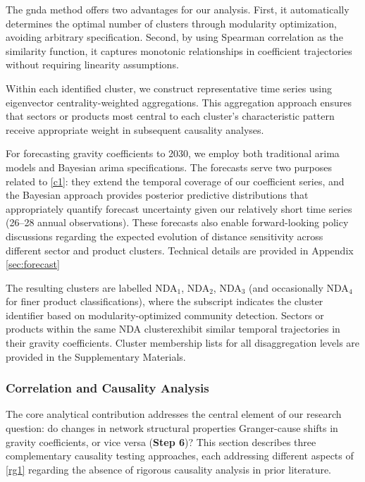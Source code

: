 \documentclass[preprint, 3p,
authoryear]{elsarticle} %
\begin{document}
The \gls{gnda} method offers two advantages for our analysis. First, it
automatically determines the optimal number of clusters through
modularity optimization, avoiding arbitrary specification. Second, by
using Spearman correlation as the similarity function, it captures
monotonic relationships in coefficient trajectories without requiring
linearity assumptions.

Within each identified cluster, we construct representative time series
using eigenvector centrality-weighted aggregations. This aggregation
approach ensures that sectors or products most central to each cluster's
characteristic pattern receive appropriate weight in subsequent
causality analyses.

For forecasting gravity coefficients to 2030, we employ both traditional
\gls{arima} models and Bayesian \gls{arima} specifications. The
forecasts serve two purposes related to \ref{c1}: they extend the
temporal coverage of our coefficient series, and the Bayesian approach
provides posterior predictive distributions that appropriately quantify
forecast uncertainty given our relatively short time series (26--28
annual observations). These forecasts also enable forward-looking policy
discussions regarding the expected evolution of distance sensitivity
across different sector and product clusters. Technical details are
provided in Appendix \ref{sec:forecast}

The resulting clusters are labelled NDA\(_1\), NDA\(_2\), NDA\(_3\) (and
occasionally NDA\(_4\) for finer product classifications), where the
subscript indicates the cluster identifier based on modularity-optimized
community detection. Sectors or products within the same NDA
clusterexhibit similar temporal trajectories in their gravity
coefficients. Cluster membership lists for all disaggregation levels are
provided in the Supplementary Materials.

\subsubsection{Correlation and Causality
Analysis}\label{correlation-and-causality-analysis}

The core analytical contribution addresses the central element of our
research question: do changes in network structural properties
Granger-cause shifts in gravity coefficients, or vice versa
(\textbf{Step 6})? This section describes three complementary causality
testing approaches, each addressing different aspects of \ref{rg1}
regarding the absence of rigorous causality analysis in prior
literature.
\end{document}
